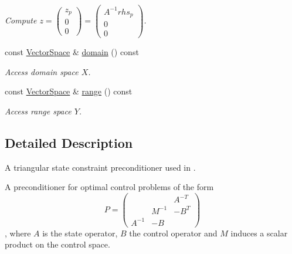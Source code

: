 \begin{DoxyCompactItemize}
\begin{DoxyCompactList}\small\item\em Compute $ z = \left( \begin{array}{c} z_p \\ 0 \\ 0 \end{array} \right) = \left( \begin{array}{c} A^{-1}rhs_p \\ 0 \\ 0 \end{array} \right) $. \end{DoxyCompactList}\item 
const \hyperlink{classSpacy_1_1VectorSpace}{Vector\+Space} \& \hyperlink{classSpacy_1_1OperatorBase_a2588f9b3e0188820c4c494e63293dc6f}{domain} () const \hypertarget{classSpacy_1_1OperatorBase_a2588f9b3e0188820c4c494e63293dc6f}{}\label{classSpacy_1_1OperatorBase_a2588f9b3e0188820c4c494e63293dc6f}

\begin{DoxyCompactList}\small\item\em Access domain space $X$. \end{DoxyCompactList}\item 
const \hyperlink{classSpacy_1_1VectorSpace}{Vector\+Space} \& \hyperlink{classSpacy_1_1OperatorBase_ab19d3b7a6f290b1079248f1e567e53d6}{range} () const \hypertarget{classSpacy_1_1OperatorBase_ab19d3b7a6f290b1079248f1e567e53d6}{}\label{classSpacy_1_1OperatorBase_ab19d3b7a6f290b1079248f1e567e53d6}

\begin{DoxyCompactList}\small\item\em Access range space $Y$. \end{DoxyCompactList}\end{DoxyCompactItemize}


\subsection{Detailed Description}
A triangular state constraint preconditioner used in \cite{Lubkoll2015a}. 

A preconditioner for optimal control problems of the form \[ P=\left( \begin{array}{ccc} & & A^{-T} \\ & M^{-1} & -B^T \\ A^{-1} & -B & \end{array} \right)\], where $A$ is the state operator, $B$ the control operator and $M$ induces a scalar product on the control space. 

